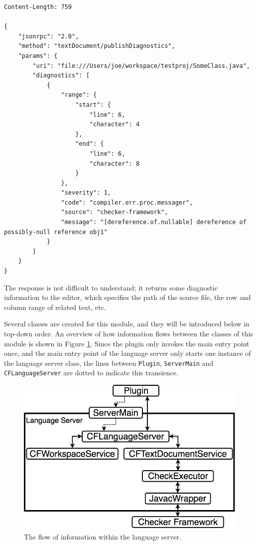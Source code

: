 \documentclass{article}
\begin{document}
\begin{lstlisting}
Content-Length: 759

{
    "jsonrpc": "2.0",
    "method": "textDocument/publishDiagnostics",
    "params": {
        "uri": "file:///Users/joe/workspace/testproj/SomeClass.java",
        "diagnostics": [
            {
                "range": {
                    "start": {
                        "line": 6,
                        "character": 4
                    },
                    "end": {
                        "line": 6,
                        "character": 8
                    }
                },
                "severity": 1,
                "code": "compiler.err.proc.messager",
                "source": "checker-framework",
                "message": "[dereference.of.nullable] dereference of possibly-null reference obj1"
            }
        ]
    }
}
\end{lstlisting}

The response is not difficult to understand; it returns some diagnostic information to the editor, which specifies the path of the source file, the row and column range of related text, etc.

Several classes are created for this module, and they will be introduced below in top-down order. An overview of how information flows between the classes of this module is shown in Figure \ref{fig:ls-modules}. Since the plugin only invokes the main entry point once, and the main entry point of the language server only starts one instance of the language server class, the lines between \verb|Plugin|, \verb|ServerMain| and \verb|CFLanguageServer| are dotted to indicate this transience.

\begin{figure}[ht]
\centering
\includegraphics[scale=0.3]{infoflow.png}
\caption{The flow of information within the language server.}
\label{fig:ls-modules}
\end{figure}
\end{document}

